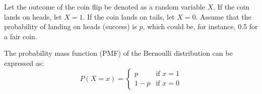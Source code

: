 \documentclass{article}
\begin{document}
Let the outcome of the coin flip be denoted as a random variable \( X \). If the coin lands on heads, let \( X = 1 \). If the coin lands on tails, let \( X = 0 \). Assume that the probability of landing on heads (success) is \( p \), which could be, for instance, 0.5 for a fair coin. 

The probability mass function (PMF) of the Bernoulli distribution can be expressed as:
\[
P(X = x) = 
\begin{cases} 
p & \text{if } x = 1 \\
1 - p & \text{if } x = 0 
\end{cases}
\]
\end{document}
